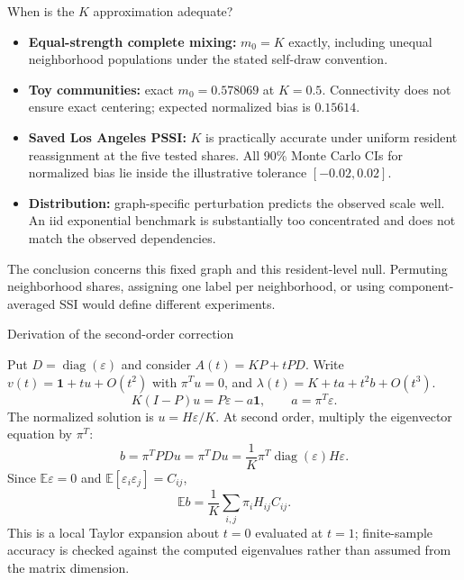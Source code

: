 \documentclass[aspectratio=169,10pt]{beamer}
\begin{document}
\begin{frame}{When is the $K$ approximation adequate?}
\small

\begin{itemize}
\item \textbf{Equal-strength complete mixing:} $m_0=K$ exactly, including unequal neighborhood populations under the stated self-draw convention.
\item \textbf{Toy communities:} exact $m_0=0.578069$ at $K=0.5$. Connectivity does not ensure exact centering; expected normalized bias is $0.15614$.
\item \textbf{Saved Los Angeles PSSI:} $K$ is practically accurate under uniform resident reassignment at the five tested shares. All 90\% Monte Carlo CIs for normalized bias lie inside the illustrative tolerance $[-0.02,0.02]$.
\item \textbf{Distribution:} graph-specific perturbation predicts the observed scale well. An iid exponential benchmark is substantially too concentrated and does not match the observed dependencies.
\end{itemize}
\medskip
The conclusion concerns this fixed graph and this resident-level null. Permuting neighborhood shares, assigning one label per neighborhood, or using component-averaged SSI would define different experiments.

\end{frame}

\begin{frame}{Derivation of the second-order correction}
\small

Put $D=\operatorname{diag}(\varepsilon)$ and consider $A(t)=KP+tPD$.
Write $v(t)=\mathbf1+t u+O(t^2)$ with $\pi^Tu=0$, and
$\lambda(t)=K+t a+t^2 b+O(t^3)$.
\[
 K(I-P)u=P\varepsilon-a\mathbf1,\qquad a=\pi^T\varepsilon.
\]
The normalized solution is $u=H\varepsilon/K$. At second order, multiply the eigenvector equation by $\pi^T$:
\[
 b=\pi^TPD u=\pi^TDu
   =\frac1K\pi^T\operatorname{diag}(\varepsilon)H\varepsilon.
\]
Since $\mathbb E\varepsilon=0$ and $\mathbb E[\varepsilon_i\varepsilon_j]=C_{ij}$,
\[
 \mathbb E b=\frac1K\sum_{i,j}\pi_iH_{ij}C_{ij}.
\]
\footnotesize This is a local Taylor expansion about $t=0$ evaluated at $t=1$; finite-sample accuracy is checked against the computed eigenvalues rather than assumed from the matrix dimension.

\end{frame}
\end{document}
